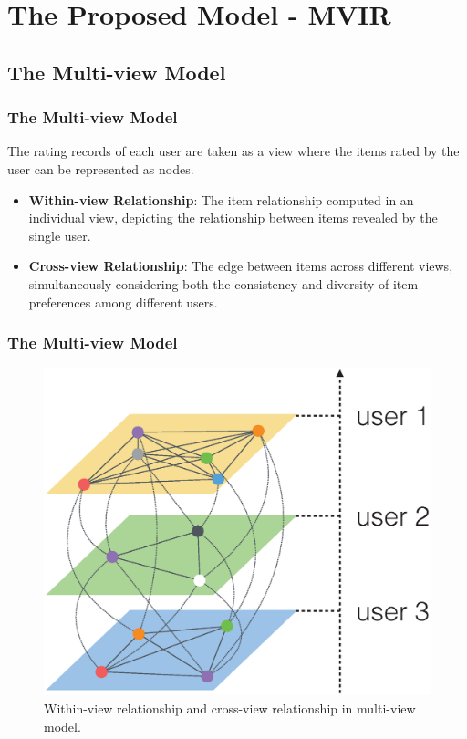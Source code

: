 \documentclass{beamer}
\begin{document}
\section{The Proposed Model - MVIR}
\subsection{The Multi-view Model}
\begin{frame}
\frametitle{The Multi-view Model}
The rating records of each user are taken as a view where the items rated by the user can be represented as nodes.%
\vskip 0.2in
\begin{itemize}
\item \textbf{Within-view Relationship}: The item relationship computed in an individual view, depicting the relationship between items revealed by the single user.
\vskip 0.2in
\item \textbf{Cross-view Relationship}: The edge between items across different views, simultaneously considering both the consistency and diversity of item preferences among different users.
\end{itemize}
\end{frame}

\begin{frame}
\frametitle{The Multi-view Model}
\begin{figure}[!t]
\renewcommand{\subfigcapskip}{-4pt}
\renewcommand{\subfigbottomskip}{0pt}
\centering
\includegraphics[width=0.6\linewidth]{Figures/Multiview.eps}
\caption{Within-view relationship and cross-view relationship in multi-view model.}
\label{fig:Multiview}
\end{figure}
\end{frame}
\end{document}

